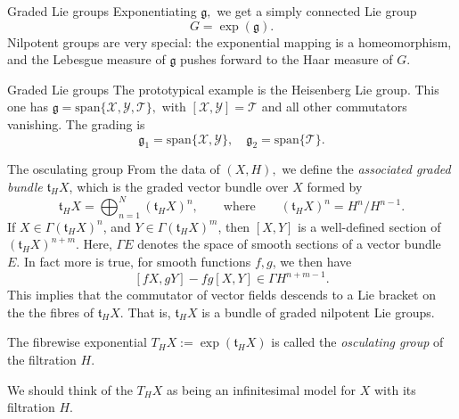\documentclass{beamer}
\numberwithin{equation}{section}
\theoremstyle{plain}
\theoremstyle{plain}
\theoremstyle{definition}
\theoremstyle{plain}
\theoremstyle{plain}
\theoremstyle{definition}
\newcommand{\Rl}{\mathbb{R}}
\newcommand{\Tc}{\mathcal{T}}
\newcommand{\Xc}{\mathcal{X}}
\newcommand{\Yc}{\mathcal{Y}}
\newcommand{\gf}{\mathfrak{g}}
\newcommand{\tf}{\mathfrak{t}}
\begin{document}
\begin{frame}{Graded Lie groups}
  Exponentiating $\gf,$ we get a simply connected Lie group
  \[
    G = \exp(\gf).
  \]
  Nilpotent groups are very special: the exponential mapping is a homeomorphism, and the Lebesgue measure of $\gf$ pushes forward to the Haar measure of $G.$
\end{frame}


\begin{frame}{Graded Lie groups}
  The prototypical example is the Heisenberg Lie group. This one has $\gf = \mathrm{span}\{\Xc,\Yc,\Tc\},$ with $[\Xc,\Yc] = \Tc$ and all other commutators vanishing. The grading is
  \[
    \gf_1 = \mathrm{span}\{\Xc,\Yc\},\quad \gf_2 = \mathrm{span}\{\Tc\}.
  \]
\end{frame}

\begin{frame}{The osculating group}
  From the data of $(X,H),$ we define the {\it associated graded bundle} $\mathfrak{t}_HX$, which is the graded vector bundle over $X$ formed by
  \[
      \mathfrak{t}_HX=\bigoplus_{n=1}^N (\mathfrak{t}_HX)^n,\qquad\text{where}\qquad (\mathfrak{t}_HX)^n=H^n/H^{n-1}.
  \]
  If $X\in\Gamma (\mathfrak{t}_HX)^n$, and $Y\in \Gamma(\mathfrak{t}_HX)^m$, then
  $[X,Y]$ is a well-defined section of $(\mathfrak{t}_HX)^{n+m}$. Here, $\Gamma E$ denotes the space of smooth sections of a vector bundle $E.$ In fact more is true, for smooth functions $f,g$, we then have
  \[
      [fX,gY]-fg[X,Y]\in\Gamma H^{n+m-1}.
  \]
  This implies that the commutator of vector fields descends to a Lie bracket on the the fibres of $\tf_HX.$ That is, $\tf_HX$ is a bundle of graded nilpotent Lie groups.

  The fibrewise exponential $T_HX := \exp(\tf_HX)$ is called the \emph{osculating group} of the filtration $H.$

  \pause
  We should think of the $T_HX$ as being an infinitesimal model for $X$ with its filtration $H.$
\end{frame}
\end{document}
